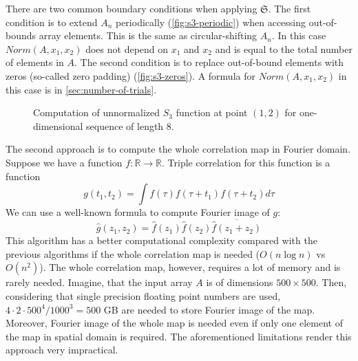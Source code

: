 \documentclass[1p]{elsarticle}
\begin{document}
There are two common boundary conditions when applying $\mathfrak{S}$. The first
condition is to extend $A_n$ periodically (\cref{fig:s3-periodic}) when
accessing out-of-bounds array elements. This is the same as circular-shifting
$A_n$. In this case $Norm(A, x_1, x_2)$ does not depend on $x_1$ and $x_2$ and
is equal to the total number of elements in $A$. The second condition is to
replace out-of-bound elements with zeros (so-called zero padding)
(\cref{fig:s3-zeros}). A formula for $Norm(A, x_1, x_2)$ in this case is in
\ref{sec:number-of-trials}.
\begin{figure}[tp]
  \centering
  \hfill
  \caption[]{Computation of unnormalized $S_3$ function at point $(1, 2)$ for
    one-dimensional sequence of length 8.}
  \label{fig:s3-computation}
\end{figure}

The second approach is to compute the whole correlation map in Fourier
domain. Suppose we have a function
$f: \mathbb{R} \rightarrow \mathbb{R}$. Triple correlation for this function is
a function
\begin{equation}
  g(t_1, t_2) = \int f(\tau) f(\tau + t_1) f(\tau + t_2) d \tau
\end{equation}
We can use a well-known formula to compute Fourier image of $g$:
\begin{equation}
  \hat{g}(z_1, z_2) = \hat{f}(z_1) \hat{f}(z_2) \overline{\hat{f}(z_1 + z_2)}
\end{equation}
This algorithm has a better computational complexity compared with the previous
algorithms if the whole correlation map is needed ($O(n \log n)$ vs
$O(n^2)$). The whole correlation map, however, requires a lot of memory and is
rarely needed. Imagine, that the input array $A$ is of dimensions
$500 \times 500$. Then, considering that single precision floating point numbers
are used, $4 \cdot 2 \cdot 500^4 / 1000^3 = 500$ GB are needed to store Fourier
image of the map. Moreover, Fourier image of the whole map is needed even if
only one element of the map in spatial domain is required. The aforementioned
limitations render this approach very impractical.
\end{document}
